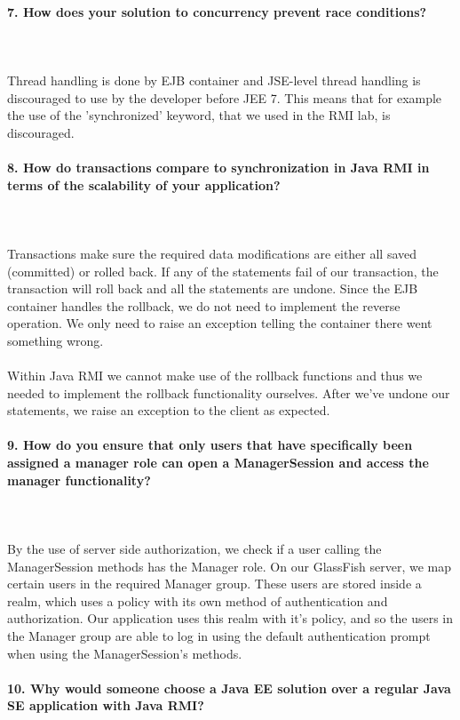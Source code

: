 \documentclass{ds-report}
\begin{document}
 

	\paragraph{7. How does your solution to concurrency prevent race conditions?} \mbox{}\\\\
Thread handling is done by EJB container and JSE-level thread handling is discouraged to use by the developer before JEE 7. This means that for example the use of the 'synchronized' keyword, that we used in the RMI lab, is discouraged.




	\paragraph{8. How do transactions compare to synchronization in Java RMI in terms of the scalability of your application?} \mbox{}\\\\
Transactions make sure the required data modifications are either all saved (committed) or rolled back. If any of the statements fail of our transaction, the transaction will roll back and all the statements are undone. Since the EJB container handles the rollback, we do not need to implement the reverse operation. We only need to raise an exception telling the container there went something wrong.\mbox{}\\\\
Within Java RMI we cannot make use of the rollback functions and thus we needed to implement the rollback functionality ourselves. After we've undone our statements, we raise an exception to the client as expected.





	\paragraph{9. How do you ensure that only users that have specifically been assigned a manager role can open a ManagerSession and access the manager functionality?} \mbox{}\\\\
By the use of server side authorization, we check if a user calling the ManagerSession methods has the Manager role. On our GlassFish server, we map certain users in the required Manager group. These users are stored inside a realm, which uses a policy with its own method of authentication and authorization. Our application uses this realm with it's policy, and so the users in the Manager group are able to log in using the default authentication prompt when using the ManagerSession's methods. 







	\paragraph{10.  Why would someone choose a Java EE solution over a regular Java SE application with Java RMI?} \mbox{}\\\\



	
	\clearpage

	
\end{document}

